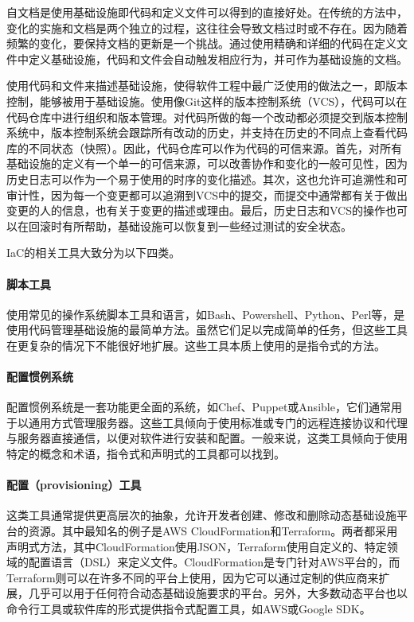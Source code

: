 \documentclass[macfonts,master]{njuthesis}
\begin{document}
自文档是使用基础设施即代码和定义文件可以得到的直接好处。在传统的方法中，变化的实施和文档是两个独立的过程，这往往会导致文档过时或不存在。因为随着频繁的变化，要保持文档的更新是一个挑战。通过使用精确和详细的代码在定义文件中定义基础设施，代码和文件会自动触发相应行为，并可作为基础设施的文档\cite{morris2016infrastructure}\cite{whatisiac}。

使用代码和文件来描述基础设施，使得软件工程中最广泛使用的做法之一，即版本控制，能够被用于基础设施。使用像Git这样的版本控制系统（VCS），代码可以在代码仓库中进行组织和版本管理。对代码所做的每一个改动都必须提交到版本控制系统中，版本控制系统会跟踪所有改动的历史，并支持在历史的不同点上查看代码库的不同状态（快照）。因此，代码仓库可以作为代码的可信来源。首先，对所有基础设施的定义有一个单一的可信来源，可以改善协作和变化的一般可见性，因为历史日志可以作为一个易于使用的时序的变化描述。其次，这也允许可追溯性和可审计性，因为每一个变更都可以追溯到VCS中的提交，而提交中通常都有关于做出变更的人的信息，也有关于变更的描述或理由。最后，历史日志和VCS的操作也可以在回滚时有所帮助，基础设施可以恢复到一些经过测试的安全状态。

IaC的相关工具大致分为以下四类\cite{whatisiac}。

\paragraph{脚本工具}

使用常见的操作系统脚本工具和语言，如Bash、Powershell、Python、Perl等，是使用代码管理基础设施的最简单方法。虽然它们足以完成简单的任务，但这些工具在更复杂的情况下不能很好地扩展。这些工具本质上使用的是指令式的方法。

\paragraph{配置惯例系统}

配置惯例系统是一套功能更全面的系统，如Chef、Puppet或Ansible，它们通常用于以通用方式管理服务器。这些工具倾向于使用标准或专门的远程连接协议和代理与服务器直接通信，以便对软件进行安装和配置。一般来说，这类工具倾向于使用特定的概念和术语，指令式和声明式的工具都可以找到。

\paragraph{配置（provisioning）工具}

这类工具通常提供更高层次的抽象，允许开发者创建、修改和删除动态基础设施平台的资源。其中最知名的例子是AWS CloudFormation和Terraform。两者都采用声明式方法，其中CloudFormation使用JSON，Terraform使用自定义的、特定领域的配置语言（DSL）来定义文件。CloudFormation是专门针对AWS平台的，而Terraform则可以在许多不同的平台上使用，因为它可以通过定制的供应商来扩展，几乎可以用于任何符合动态基础设施要求的平台。另外，大多数动态平台也以命令行工具或软件库的形式提供指令式配置工具，如AWS或Google SDK。
\end{document}
